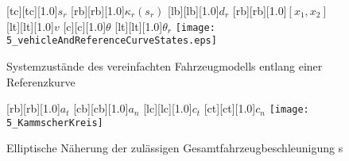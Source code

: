 \begin{figure}%
\centering
\begin{minipage}{0.45\textwidth}%
[tc][tc][1.0]{$s_r$}
    [rb][rb][1.0]{$\kappa_r(s_r)$}
    [lb][lb][1.0]{$d_r$}
    [rb][rb][1.0]{$[x_1, x_2]$}
    [lt][lt][1.0]{$v$}
    [c][c][1.0]{$\theta$}
    [lt][lt][1.0]{$\theta_r$}
    \texttt{[image: 5\_vehicleAndReferenceCurveStates.eps]}
    \caption[Fahrzeugdynamik entlang einer Referenzkurve]{Systemzustände des vereinfachten Fahrzeugmodells entlang einer Referenzkurve }
    \label{fig:systemStates}
\end{minipage}%
\qquad
\begin{minipage}{0.45\textwidth}%
    [rb][rb][1.0]{$a_t$}
    [cb][cb][1.0]{$a_n$}
    [lc][lc][1.0]{$c_t$}
    [ct][ct][1.0]{$c_n$}
    \texttt{[image: 5\_KammscherKreis]}
    \caption[Elliptische Näherung der zulässigen Fahrzeugbeschleunigung]{Elliptische Näherung der zulässigen Gesamtfahrzeugbeschleunigung s}
    \label{fig:kammscherKreis}
\end{minipage}%
\end{figure}%

